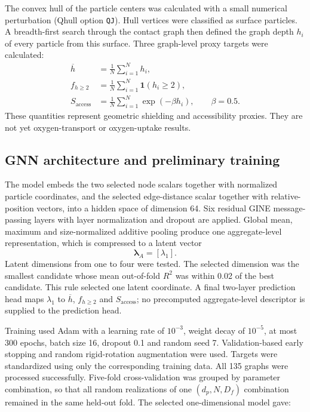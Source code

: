 The convex hull of the particle centers was calculated with a small numerical
perturbation (Qhull option \texttt{QJ}). Hull vertices were classified as
surface particles. A breadth-first search through the contact graph then
defined the graph depth $h_i$ of every particle from this surface. Three
graph-level proxy targets were calculated:
\begin{align}
 \overline{h} &= \frac{1}{N}\sum_{i=1}^{N}h_i,\\
 f_{h\geq2} &= \frac{1}{N}\sum_{i=1}^{N}\mathbf{1}(h_i\geq2),\\
 S_{\mathrm{access}} &= \frac{1}{N}\sum_{i=1}^{N}\exp(-\beta h_i),
 \qquad \beta=0.5.
\end{align}
These quantities represent geometric shielding and accessibility proxies. They
are not yet oxygen-transport or oxygen-uptake results.

\subsection{GNN architecture and preliminary training}

The model embeds the two selected node scalars together with normalized
particle coordinates, and the selected edge-distance scalar together with
relative-position vectors, into a hidden space of dimension 64. Six residual
GINE message-passing layers with layer normalization and dropout are applied.
Global mean, maximum and size-normalized additive pooling produce one
aggregate-level representation, which is compressed to a latent vector
\begin{equation}
 \boldsymbol{\lambda}_A=[\lambda_1].
\end{equation}
Latent dimensions from one to four were tested. The selected dimension was the
smallest candidate whose mean out-of-fold $R^2$ was within 0.02 of the best
candidate. This rule selected one latent coordinate. A final two-layer
prediction head maps $\lambda_1$ to $\overline{h}$, $f_{h\geq2}$ and
$S_{\mathrm{access}}$; no precomputed aggregate-level descriptor is supplied
to the prediction head.

Training used Adam with a learning rate of $10^{-3}$, weight decay of $10^{-5}$,
at most 300 epochs, batch size 16, dropout 0.1 and random seed 7. Validation-based
early stopping and random rigid-rotation augmentation were used. Targets were
standardized using only the corresponding training data. All 135 graphs were
processed successfully. Five-fold cross-validation was grouped by parameter
combination, so that all random realizations of one $(d_p,N,D_f)$ combination
remained in the same held-out fold. The selected one-dimensional model gave:

